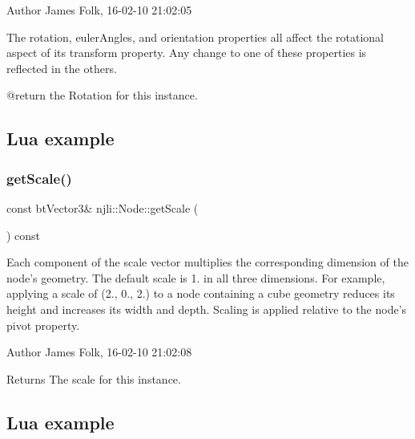 \begin{DoxyAuthor}{Author}
James Folk, 16-\/02-\/10 21\+:02\+:05
\end{DoxyAuthor}
The rotation, euler\+Angles, and orientation properties all affect the rotational aspect of its transform property. Any change to one of these properties is reflected in the others. \begin{DoxyVerb} @return the Rotation for this instance.
\end{DoxyVerb}
\hypertarget{classnjli_1_1_steering_behavior_wander_ex1}{}\subsection{Lua example}\label{classnjli_1_1_steering_behavior_wander_ex1}

\begin{DoxyCodeInclude}
\end{DoxyCodeInclude}
\mbox{\label{classnjli_1_1_node_a623cb5452d643d156fdaa2a7a0c2ce43}} 
\subsubsection{\texorpdfstring{get\+Scale()}{getScale()}}
{\footnotesize\ttfamily const bt\+Vector3\& njli\+::\+Node\+::get\+Scale (\begin{DoxyParamCaption}{ }\end{DoxyParamCaption}) const}



Each component of the scale vector multiplies the corresponding dimension of the node’s geometry. The default scale is 1. in all three dimensions. For example, applying a scale of (2., 0., 2.) to a node containing a cube geometry reduces its height and increases its width and depth. Scaling is applied relative to the node’s pivot property. 

\begin{DoxyAuthor}{Author}
James Folk, 16-\/02-\/10 21\+:02\+:08
\end{DoxyAuthor}
\begin{DoxyReturn}{Returns}
The scale for this instance.
\end{DoxyReturn}
\hypertarget{classnjli_1_1_steering_behavior_wander_ex1}{}\subsection{Lua example}\label{classnjli_1_1_steering_behavior_wander_ex1}

